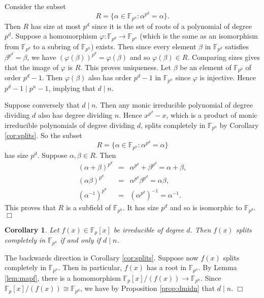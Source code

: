 \documentclass{article}
\def\F{{\mathbb F}}
\def\F{{\mathbb F}}
\newtheorem{cor}[subsection]{Corollary}
\newenvironment{proof}{\noindent {\bf Proof:}}{$\Box$ \vspace{2 ex}}
\begin{document}
\begin{proof}
    Consider the subset $$R = \{\alpha\in\F_{p^n}\colon \alpha^{p^d} = \alpha\}.$$ Then $R$ has size at most $p^d$ since it is the set of roots of a polynomial of degree $p^d$. Suppose a homomorphism $\varphi:\F_{p^d}\rightarrow\F_{p^n}$ (which is the same as an isomorphism from $\F_{p^d}$ to a subring of $\F_{p^n}$) exists. Then since every element $\beta$ in $\F_{p^d}$ satisfies $\beta^{p^d} = \beta$, we have $(\varphi(\beta))^{p^d} = \varphi(\beta)$ and so $\varphi(\beta)\in R$. Comparing sizes gives that the image of $\varphi$ is $R$. This proves uniqueness. Let $\beta$ be an element of $\F_{p^d}$ of order $p^d - 1$. Then $\varphi(\beta)$ also has order $p^d - 1$ in $\F_{p^n}$ since $\varphi$ is injective. Hence $p^d - 1\mid p^n - 1$, implying that $d\mid n$.
    
    Suppose conversely that $d\mid n.$ Then any monic irreducible polynomial of degree dividing $d$ also has degree dividing $n$. Hence $x^{p^d} - x$, which is a product of monic irreducible polynomials of degree dividing $d$, splits completely in $\F_{p^n}$ by Corollary \ref{cor:splits}. So the subset $$R = \{\alpha\in\F_{p^n}\colon \alpha^{p^d} = \alpha\}$$ has size $p^d$. Suppose $\alpha,\beta\in R$. Then
    \begin{eqnarray*}
        (\alpha+\beta)^{p^d} &=& \alpha^{p^d} + \beta^{p^d} = \alpha + \beta,\\
        (\alpha\beta)^{p^d} &=& \alpha^{p^d}\beta^{p^d} = \alpha\beta,\\
        (\alpha^{-1})^{p^d} &=& (\alpha^{p^d})^{-1} = \alpha^{-1}.
    \end{eqnarray*}
    This proves that $R$ is a subfield of $\F_{p^n}$. It has size $p^d$ and so is isomorphic to $\F_{p^d}$. 
\end{proof}

\begin{cor}\label{cor:splitconverse}
    Let $f(x)\in\F_p[x]$ be irreducible of degree $d$. Then $f(x)$ splits completely in $\F_{p^n}$ if and only if $d\mid n$.
\end{cor}

\begin{proof}
    The backwards direction is Corollary \ref{cor:splits}. Suppose now $f(x)$ splits completely in $\F_{p^n}$. Then in particular, $f(x)$ has a root in $\F_{p^n}$. By Lemma \ref{lem:mapf}, there is a homomorphism $\F_p[x]/(f(x))\rightarrow\F_{p^n}$. Since $\F_p[x]/(f(x))\cong \F_{p^d}$, we have by Proposition \ref{prop:dmidn} that $d\mid n$.
\end{proof}
\end{document}
